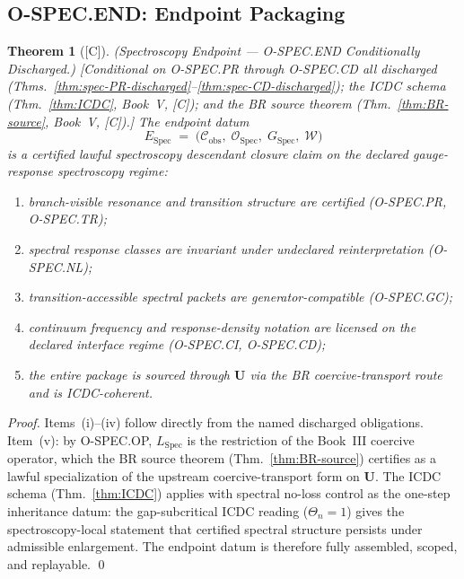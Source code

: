 \documentclass[12pt,oneside]{amsbook}
\theoremstyle{plain}
\newtheorem{theorem}{Theorem}[section]
\theoremstyle{definition}
\theoremstyle{remark}
\newcommand{\status}[1]{\textup{[#1]}}
\begin{document}
\subsection{O-SPEC.END: Endpoint Packaging}\label{sec:spec-END}

\begin{theorem}[\status{C}]\label{thm:spec-END-discharged}
\textup{(Spectroscopy Endpoint --- O-SPEC.END Conditionally Discharged.)}
\textup{[Conditional on O-SPEC.PR through O-SPEC.CD all discharged
(Thms.~\ref{thm:spec-PR-discharged}--\ref{thm:spec-CD-discharged}); the
ICDC schema (Thm.~\ref{thm:ICDC}, Book~V, [C]); and the BR source theorem
(Thm.~\ref{thm:BR-source}, Book~V, [C]).]}
The endpoint datum
\[
 E_{\mathrm{Spec}} \;=\;
 \bigl(\mathcal{C}_{\mathrm{obs}},\;
 \mathcal{O}_{\mathrm{Spec}},\;
 G_{\mathrm{Spec}},\;
 \mathcal{W}\bigr)
\]
is a certified lawful spectroscopy descendant closure claim on the declared
gauge-response spectroscopy regime:
\begin{enumerate}[label=\textup{(\roman*)}]
 \item branch-visible resonance and transition structure are certified
 (O-SPEC.PR, O-SPEC.TR);
 \item spectral response classes are invariant under undeclared
 reinterpretation (O-SPEC.NL);
 \item transition-accessible spectral packets are generator-compatible
 (O-SPEC.GC);
 \item continuum frequency and response-density notation are licensed
 on the declared interface regime (O-SPEC.CI, O-SPEC.CD);
 \item the entire package is sourced through $\mathbf{U}$ via the BR
 coercive-transport route and is ICDC-coherent.
\end{enumerate}
\end{theorem}

\begin{proof}
Items~(i)--(iv) follow directly from the named discharged obligations.
Item~(v): by O-SPEC.OP, $L_{\mathrm{Spec}}$ is the restriction of the
Book~III coercive operator, which the BR source theorem
(Thm.~\ref{thm:BR-source}) certifies as a lawful specialization of the
upstream coercive-transport form on $\mathbf{U}$. The ICDC schema
(Thm.~\ref{thm:ICDC}) applies with spectral no-loss control as the
one-step inheritance datum: the gap-subcritical ICDC reading
($\Theta_n = 1$) gives the spectroscopy-local statement that certified
spectral structure persists under admissible enlargement. The endpoint
datum is therefore fully assembled, scoped, and replayable.
\qed
\end{proof}
\end{document}

